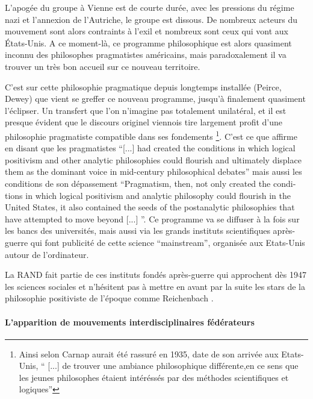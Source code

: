 L'apogée du groupe à Vienne est de courte durée, avec les pressions du régime nazi et l'annexion de l'Autriche, le groupe est dissous. De nombreux acteurs du mouvement sont alors contraints à l'exil et nombreux sont ceux qui vont aux États-Unis. A ce moment-là, ce programme philosophique est alors quasiment inconnu des philosophes pragmatistes américains, mais paradoxalement il va trouver un très bon accueil sur ce nouveau territoire.

C'est sur cette philosophie pragmatique depuis longtemps installée (Peirce, Dewey) que vient se greffer ce nouveau programme, jusqu'à finalement quasiment l'éclipser. Un transfert que l'on n'imagine pas totalement unilatéral, et il est presque évident que le discours originel viennois tire largement profit d'une philosophie pragmatiste compatible dans ses fondements \footnote{ Ainsi selon \textcite[149]{Ouelbani2006} Carnap aurait été rassuré en 1935, date de son arrivée aux Etats-Unis, \enquote{ [...] de trouver une ambiance philosophique différente,en ce sens que les jeunes philosophes étaient intéréssés par des méthodes scientifiques et logiques}}. C'est ce que \textcite[123]{Wilson1995} affirme en disant que les pragmatistes \foreignquote{english}{[...] had created the conditions in which logical positivism and other analytic philosophies could flourish and ultimately displace them as the dominant voice in mid-century philosophical debates} mais aussi les conditions de son dépassement \foreignquote{english}{Pragmatism, then, not only created the conditions in which logical positivism and analytic philosophy could flourish in the United States, it also contained the seeds of the postanalytic philosophies that have attempted to move beyond [...] }. Ce programme va se diffuser à la fois sur les bancs des universités, mais aussi via les grands instituts scientifiques après-guerre qui font publicité de cette science \foreignquote{english}{mainstream}, organisée aux Etats-Unis autour de l'ordinateur.

La RAND fait partie de ces instituts fondés après-guerre qui approchent dès 1947 les sciences sociales \autocite{Rand106} et n'hésitent pas à mettre en avant par la suite les stars de la philosophie positiviste de l'époque comme Reichenbach \autocite[384-385]{Barnes2011} .

\paragraph{L'apparition de mouvements interdisciplinaires fédérateurs}

